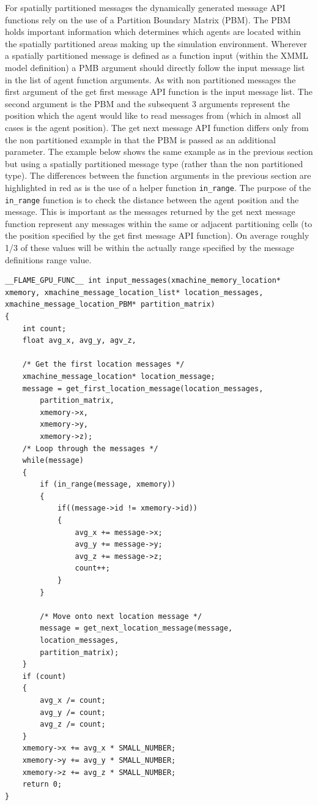 \documentclass[11pt, a4paper, onecolumn, oneside]{report}
\begin{document}
For spatially partitioned messages the dynamically generated message API functions rely on the use of a Partition Boundary Matrix (PBM).
The PBM holds important information which determines which agents are located within the spatially partitioned areas making up the simulation environment.
Wherever a spatially partitioned message is defined as a function input (within the XMML model definition) a PMB argument should directly follow the input message list in the list of agent function arguments.
As with non partitioned messages the first argument of the get first message API function is the input message list.
The second argument is the PBM and the subsequent 3 arguments represent the position which the agent would like to read messages from (which in almost all cases is the agent position).
The get next message API function differs only from the non partitioned example in that the PBM is passed as an additional parameter.
The example below shows the same example as in the previous section but using a spatially partitioned message type (rather than the non partitioned type).
The differences between the function arguments in the previous section are highlighted in red as is the use of a helper function \texttt{in_range}.
The purpose of the \texttt{in_range} function is to check the distance between the agent position and the message.
This is important as the messages returned by the get next message function represent any messages within the same or adjacent partitioning cells (to the position specified by the get first message API function).
On average roughly 1/3 of these values will be within the actually range specified by the message definitions range value.


\begin{lstlisting}[language=C_]
__FLAME_GPU_FUNC__ int input_messages(xmachine_memory_location* xmemory, xmachine_message_location_list* location_messages, xmachine_message_location_PBM* partition_matrix)
{
    int count;
    float avg_x, avg_y, agv_z,

    /* Get the first location messages */
    xmachine_message_location* location_message;
    message = get_first_location_message(location_messages,
        partition_matrix,
        xmemory->x,
        xmemory->y,
        xmemory->z);
    /* Loop through the messages */
    while(message)
    {
        if (in_range(message, xmemory))
        {
            if((message->id != xmemory->id))
            {
                avg_x += message->x;
                avg_y += message->y;
                avg_z += message->z;
                count++;
            }
        }

        /* Move onto next location message */
        message = get_next_location_message(message,
        location_messages,
        partition_matrix);
    }
    if (count)
    {
        avg_x /= count;
        avg_y /= count;
        avg_z /= count;
    }
    xmemory->x += avg_x * SMALL_NUMBER;
    xmemory->y += avg_y * SMALL_NUMBER;
    xmemory->z += avg_z * SMALL_NUMBER;
    return 0;
}
\end{lstlisting}
\end{document}
